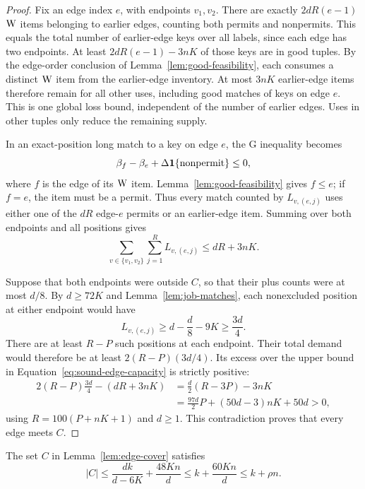\begin{proof}
Fix an edge index \(e\), with endpoints \(v_1,v_2\).
There are exactly \(2dR(e-1)\)
\(\mathrm{W}\) items belonging to earlier edges, counting both permits
and nonpermits.  This equals the total number of earlier-edge
keys over all labels, since each edge has two endpoints.
At least \(2dR(e-1)-3nK\) of those keys are in good tuples.
By the edge-order conclusion of Lemma~\ref{lem:good-feasibility},
each consumes a distinct \(\mathrm{W}\) item from the earlier-edge
inventory.  At most \(3nK\) earlier-edge items therefore remain
for all other uses, including good matches of keys on edge \(e\).
This is one global loss bound, independent of the number of
earlier edges.  Uses in other tuples only reduce the remaining
supply.

In an exact-position long match to a key on edge \(e\), the
\(\mathrm G\) inequality becomes
\[
 \beta_f-\beta_e+\Delta\mathbf{1}\{\text{nonpermit}\}\le0,
\]
where \(f\) is the edge of its \(\mathrm{W}\) item.
Lemma~\ref{lem:good-feasibility} gives \(f\le e\);
if \(f=e\), the item must be a permit.  Thus every match counted
by \(L_{v,(e,j)}\) uses either one of the \(dR\) edge-\(e\)
permits or an earlier-edge item.  Summing over both endpoints
and all positions gives
\begin{equation}\label{eq:sound-edge-capacity}
 \sum_{v\in\{v_1,v_2\}}\sum_{j=1}^R L_{v,(e,j)}
 \le dR+3nK.
\end{equation}

Suppose that both endpoints were outside \(C\), so that their
plus counts were at most \(d/8\).
By \(d\ge72K\) and Lemma~\ref{lem:job-matches}, each nonexcluded
position at either endpoint would have
\[
 L_{v,(e,j)}\ge d-\frac d8-9K\ge\frac{3d}{4}.
\]
There are at least \(R-P\) such positions at each endpoint.
Their total demand would therefore be at least
\(2(R-P)(3d/4)\).  Its excess over the upper bound in
Equation~\eqref{eq:sound-edge-capacity} is strictly positive:
\begin{align*}
 2(R-P)\frac{3d}{4}-(dR+3nK)
 &=\frac d2(R-3P)-3nK\\
 &=\frac{97d}{2}P+(50d-3)nK+50d>0,
\end{align*}
using \(R=100(P+nK+1)\) and \(d\ge1\).
This contradiction proves that every edge meets \(C\).
\end{proof}

\begin{lemma}\label{lem:cover-size}
The set \(C\) in Lemma~\ref{lem:edge-cover} satisfies
\[
 |C|\le \frac{dk}{d-6K}+\frac{48Kn}{d}
      \le k+\frac{60Kn}{d}
      \le k+\rho n.
\]
\end{lemma}

